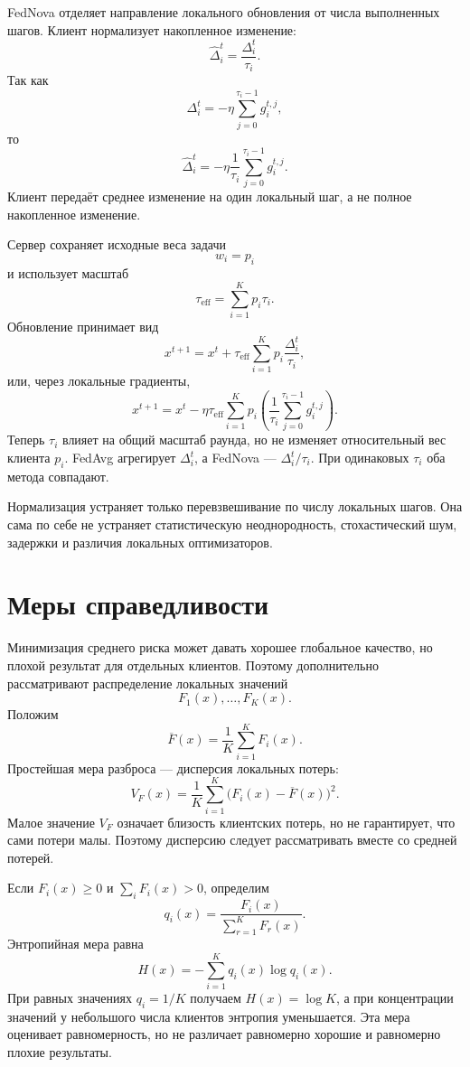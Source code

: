 FedNova отделяет направление локального обновления от числа
выполненных шагов. Клиент нормализует накопленное изменение:
\[
    \widehat\Delta_i^t
    =
    \frac{\Delta_i^t}{\tau_i}.
\]
Так как
\[
    \Delta_i^t
    =
    -\eta
    \sum_{j=0}^{\tau_i-1}g_i^{t,j},
\]
то
\[
    \widehat\Delta_i^t
    =
    -\eta
    \frac1{\tau_i}
    \sum_{j=0}^{\tau_i-1}g_i^{t,j}.
\]
Клиент передаёт среднее изменение на один локальный шаг, а не полное
накопленное изменение.

Сервер сохраняет исходные веса задачи
\[
    w_i=p_i
\]
и использует масштаб
\[
    \tau_{\mathrm{eff}}
    =
    \sum_{i=1}^{K}p_i\tau_i.
\]
Обновление принимает вид
\[
    x^{t+1}
    =
    x^t
    +
    \tau_{\mathrm{eff}}
    \sum_{i=1}^{K}p_i
    \frac{\Delta_i^t}{\tau_i},
\]
или, через локальные градиенты,
\[
    x^{t+1}
    =
    x^t
    -
    \eta\tau_{\mathrm{eff}}
    \sum_{i=1}^{K}p_i
    \left(
        \frac1{\tau_i}
        \sum_{j=0}^{\tau_i-1}g_i^{t,j}
    \right).
\]
Теперь \(\tau_i\) влияет на общий масштаб раунда, но не изменяет
относительный вес клиента \(p_i\). FedAvg агрегирует
\(\Delta_i^t\), а FedNova --- \(\Delta_i^t/\tau_i\). При
одинаковых \(\tau_i\) оба метода совпадают.

Нормализация устраняет только перевзвешивание по числу локальных
шагов. Она сама по себе не устраняет статистическую неоднородность,
стохастический шум, задержки и различия локальных оптимизаторов.

\section{Меры справедливости}

Минимизация среднего риска может давать хорошее глобальное качество,
но плохой результат для отдельных клиентов. Поэтому дополнительно
рассматривают распределение локальных значений
\[
    F_1(x),\ldots,F_K(x).
\]
Положим
\[
    \overline F(x)
    =
    \frac1K
    \sum_{i=1}^{K}F_i(x).
\]
Простейшая мера разброса --- дисперсия локальных потерь:
\[
    V_F(x)
    =
    \frac1K
    \sum_{i=1}^{K}
    \bigl(F_i(x)-\overline F(x)\bigr)^2.
\]
Малое значение \(V_F\) означает близость клиентских потерь, но не
гарантирует, что сами потери малы. Поэтому дисперсию следует
рассматривать вместе со средней потерей.

Если \(F_i(x)\ge0\) и \(\sum_iF_i(x)>0\), определим
\[
    q_i(x)
    =
    \frac{F_i(x)}
    {\displaystyle\sum_{r=1}^{K}F_r(x)}.
\]
Энтропийная мера равна
\[
    H(x)
    =
    -\sum_{i=1}^{K}q_i(x)\log q_i(x).
\]
При равных значениях \(q_i=1/K\) получаем \(H(x)=\log K\), а при
концентрации значений у небольшого числа клиентов энтропия
уменьшается. Эта мера оценивает равномерность, но не различает
равномерно хорошие и равномерно плохие результаты.

